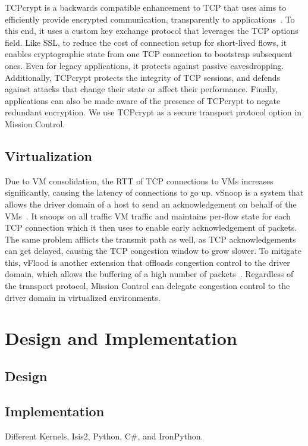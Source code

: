 \documentclass[a4paper,12pt,twoside,openright]{report}
\begin{document}
TCPcrypt is a backwards compatible enhancement to TCP that uses aims to
efficiently provide encrypted communication, transparently to
applications~\cite{bittau:the}. To this end, it uses a custom key exchange
protocol that leverages the TCP options field. Like SSL, to reduce the cost of
connection setup for short-lived flows, it enables cryptographic state from one
TCP connection to bootstrap subsequent ones. Even for legacy applications, it
protects against passive eavesdropping. Additionally, TCPcrypt protects the
integrity of TCP sessions, and defends against attacks that change their state
or affect their performance. Finally, applications can also be made aware of the
presence of TCPcrypt to negate redundant encryption. We use TCPcrypt as a secure
transport protocol option in Mission Control.

\section{Virtualization}
Due to VM consolidation, the RTT of TCP connections to VMs increases
significantly, causing the latency of connections to go up. vSnoop is a system
that allows the driver domain of a host to send an acknowledgement on behalf of
the VMs~\cite{Kangarlou:2010:VIT}. It snoops on all traffic VM traffic and
maintains per-flow state for each TCP connection which it then uses to enable
early acknowledgement of packets. The same problem afflicts the transmit path as
well, as TCP acknowledgements can get delayed, causing the TCP congestion window
to grow slower. To mitigate this, vFlood is another extension that offloads
congestion control to the driver domain, which allows the buffering of a high
number of packets~\cite{Gamage:2011:OFI}. Regardless of the transport protocol,
Mission Control can delegate congestion control to the driver domain in
virtualized environments.

\chapter{Design and Implementation}\label{chapter:designImplementation}

\section{Design}

\section{Implementation}
Different Kernels, Isis2, Python, C\#, and IronPython.
\end{document}
